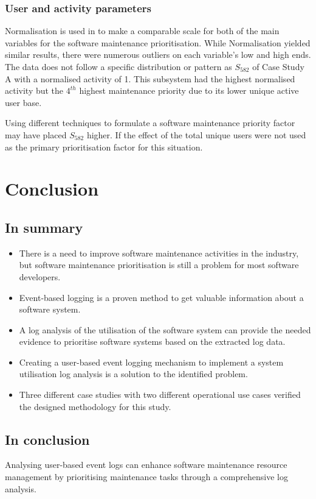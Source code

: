 \subsubsection{User and activity parameters}
\par Normalisation is used in  to make a comparable scale for both of the main variables for the software maintenance prioritisation. While Normalisation yielded similar results, there were numerous outliers on each variable's low and high ends. The data does not follow a specific distribution or pattern as $S_{582}$ of Case Study A with a normalised activity of 1. This subsystem had the highest normalised activity but the $4^{th}$ highest maintenance priority due to its lower unique active user base.\par Using different techniques to formulate a software maintenance priority factor may have placed $S_{582}$ higher. If the effect of the total unique users were not used as the primary prioritisation factor for this situation. 

\clearpage

\section{Conclusion}

\subsection{In summary}
\begin{itemize}
	\item There is a need to improve software maintenance activities in the industry, but software maintenance prioritisation is still a problem for most software developers.
	\item Event-based logging is a proven method to get valuable information about a software system.
	\item A log analysis of the utilisation of the software system can provide the needed evidence to prioritise software systems based on the extracted log data.
	\item Creating a user-based event logging mechanism to implement a system utilisation log analysis is a solution to the identified problem.
	\item Three different case studies with two different operational use cases verified the designed methodology for this study.
\end{itemize}

\subsection{In conclusion}
Analysing user-based event logs can enhance software maintenance resource management by prioritising maintenance tasks through a comprehensive log analysis.
